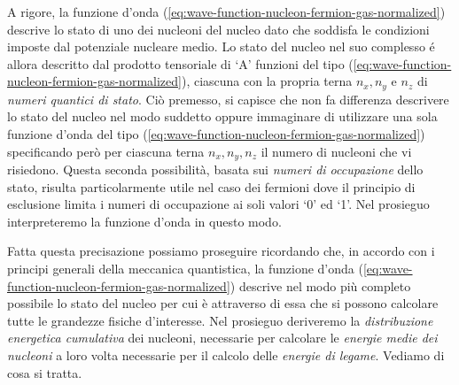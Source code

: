 A rigore, la funzione d’onda (\ref{eq:wave-function-nucleon-fermion-gas-normalized}) descrive lo stato di uno dei nucleoni del nucleo dato che soddisfa le condizioni imposte dal potenziale nucleare medio. Lo stato del nucleo nel suo complesso é allora descritto dal prodotto tensoriale di ‘A’ funzioni del tipo (\ref{eq:wave-function-nucleon-fermion-gas-normalized}), ciascuna con la propria terna $n_{x}, n_{y}$ e $n_{z}$ di \emph{numeri quantici di stato}. Ciò premesso, si capisce che non fa differenza descrivere lo stato del nucleo nel modo suddetto oppure immaginare di utilizzare una sola funzione d’onda del tipo (\ref{eq:wave-function-nucleon-fermion-gas-normalized}) specificando però per ciascuna terna $n_{x},n_{y},n_{z}$ il numero di nucleoni che vi risiedono. Questa seconda possibilità, basata sui \emph{numeri di occupazione} dello stato, risulta particolarmente utile nel caso dei fermioni dove il principio di esclusione limita i numeri di occupazione ai soli valori ‘0’ ed ‘1’. Nel prosieguo interpreteremo la funzione d’onda in questo modo.

Fatta questa precisazione possiamo proseguire ricordando che, in accordo con i principi generali della meccanica quantistica, la funzione d’onda (\ref{eq:wave-function-nucleon-fermion-gas-normalized}) descrive nel modo più completo possibile lo stato del nucleo per cui è attraverso di essa che si possono calcolare tutte le grandezze fisiche d’interesse. Nel prosieguo deriveremo la \emph{distribuzione energetica cumulativa} dei nucleoni, necessarie per calcolare le \emph{energie medie dei nucleoni} a loro volta necessarie per il calcolo delle \emph{energie di legame}. Vediamo di cosa si tratta.

